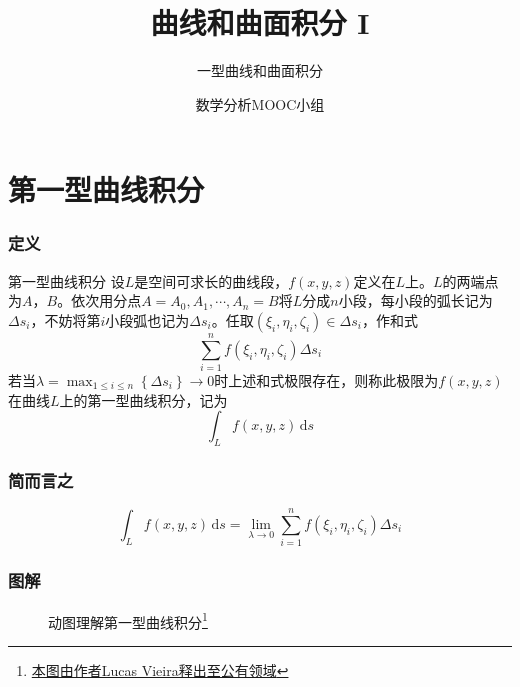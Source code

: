 \documentclass[xetex]{beamer}
\title{曲线和曲面积分 I}
\subtitle{一型曲线和曲面积分}
\author{数学分析MOOC小组}
\date{}
\begin{document}
    \frame{\maketitle}

    \section{第一型曲线积分}

    \begin{frame}
        \frametitle{定义}
    
        \begin{block}{第一型曲线积分}
            设$L$是空间可求长的曲线段，$f(x,y,z)$定义在$L$上。$L$的两端点为$A$，$B$。依次用分点$A=A_0, A_1, \cdots, A_n = B$将$L$分成$n$小段，每小段的弧长记为$\Delta s_i$，不妨将第$i$小段弧也记为$\Delta s_i$。任取$(\xi_i, \eta_i, \zeta_i)\in\Delta s_i$，作和式
            $$\sum_{i=1}^{n}f(\xi_i, \eta_i, \zeta_i)\Delta s_i$$
            若当$\displaystyle\lambda = \max_{1\leq i \leq n}\left\{\Delta s_i\right\} \to 0$时上述和式极限存在，则称此极限为$f(x,y,z)$在曲线$L$上的\alert{第一型曲线积分}，记为
            $$\int_Lf(x,y,z)\, \textrm{d}s$$
        \end{block}
    
    \end{frame}

    \begin{frame}
        \frametitle{简而言之}
    
        $$\int_Lf(x,y,z)\, \textrm{d}s = \lim_{\lambda \to 0}\sum_{i=1}^{n}f(\xi_i, \eta_i, \zeta_i)\Delta s_i$$
    
    \end{frame}

    \begin{frame}
        \frametitle{图解}
        \begin{figure}[ht]
            \centering
            \caption{动图理解第一型曲线积分\footnote[1]{\href{https://commons.wikimedia.org/wiki/File:Line_integral_of_scalar_field.gif}{本图由作者Lucas Vieira释出至公有领域}}}
            \label{fig:intcurve}
        \end{figure}
    
    \end{frame}
\end{document}
